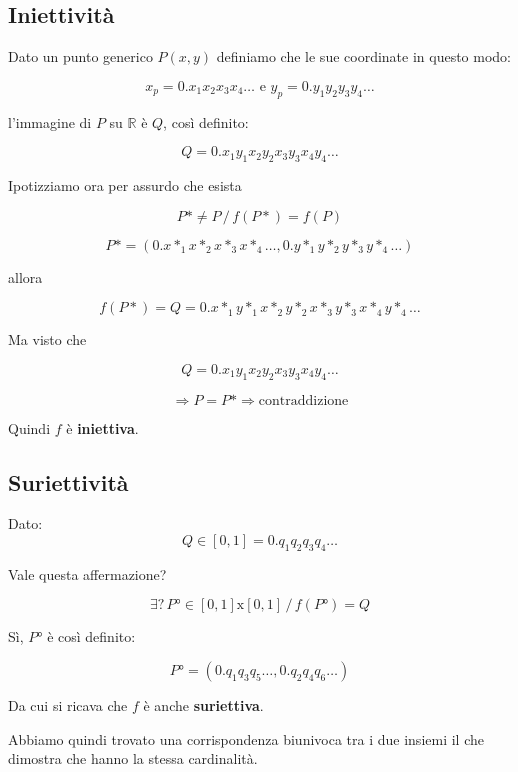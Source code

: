 \documentclass[../dimostrazioni]{subfiles}
\begin{document}
            \subsection*{Iniettività}

            Dato un punto generico \(P (x,y) \) definiamo che le sue coordinate in questo modo:
            
            \[  x_p = 0.x_1 x_2 x_3 x_4 \dots \, \, \text{e} \, \, y_p = 0.y_1 y_2 y_3 y_ 4 \dots \]
            
            l'immagine di \(P\) su \( \mathbb{R} \) è \( Q \), così definito:
            
            \[   Q = 0.x_1 y_1 x_2 y_2 x_3 y_3 x_4 y_ 4 \dots    \]
            
            Ipotizziamo ora per assurdo che esista 
            
            \[    P* \neq P \, / \, f(P*) = f(P) \]

            \[    P* = (0.x*_1 x*_2 x*_3 x*_4 \dots , 0.y*_1 y*_2 y*_3 y*_4 \dots) \]
            
            allora
            
            \[    f(P*) = Q = 0.x*_1 y*_1 x*_2 y*_2 x*_3 y*_3 x*_4 y*_4 \dots \]
            
            Ma visto che
            
            \[    Q = 0.x_1 y_1 x_2 y_2 x_3 y_3 x_4 y_ 4 \dots \]
            
            \[    \Rightarrow P = P* \Rightarrow \text{contraddizione}   \]
            
            Quindi \(f\) è \textbf{iniettiva}.

            \subsection*{Suriettività}

            Dato:
            \[    Q \in [0,1] = 0.q_1 q_2 q_3 q_4 \dots    \]

            Vale questa affermazione?
            
            \[    \exists \text{?} \, P° \in [0,1]\text{x}[0,1] \, / \, f(P°) = Q    \]

            Sì, \(P°\) è così definito:
            
            \[    P° = (0.q_1 q_3 q_5 \dots, 0.q_2 q_4 q_6 \dots)    \]

            Da cui si ricava che \(f\) è anche \textbf{suriettiva}.

            Abbiamo quindi trovato una corrispondenza biunivoca tra i due insiemi il che dimostra che hanno la stessa cardinalità.
            
\end{document}
